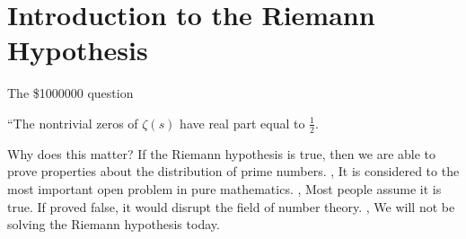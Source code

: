 \section{Introduction to the Riemann Hypothesis}
\begin{namedframe}{The \$\num{1000000} question}
	\begin{definition}
		``The nontrivial zeros of $\zeta(s)$ have real part equal to $\frac{1}{2}$.
	\end{definition}
\end{namedframe}
\begin{namedframe}{Why does this matter?}
	If the Riemann hypothesis is true, then we are able to prove properties about the distribution of prime numbers.
	\sep
	It is considered to the \alert{most important open problem} in pure mathematics.
	\sep
	Most people assume it is true.
	If proved false, it would disrupt the field of number theory.
	\sep
	We will not be solving the Riemann hypothesis today.
\end{namedframe}
